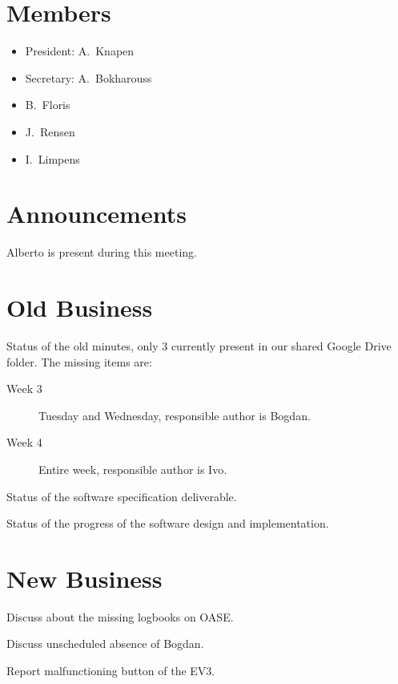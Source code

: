 \section{Members}
\begin{itemize}
	\item President: A.~Knapen
    \item Secretary: A.~Bokharouss
    \item B.~Floris
    \item J.~Rensen
    \item I.~Limpens
\end{itemize}

\section{Announcements}
\begin{items}
	\item Alberto is present during this meeting.
\end{items}


\section{Old Business}
\begin{items}
	\item Status of the old minutes, only 3 currently present in our shared Google Drive folder. The missing items are:
    \begin{description}
    	\item[Week 3] Tuesday and Wednesday, responsible author is Bogdan.
        \item[Week 4] Entire week, responsible author is Ivo.
    \end{description}
    
    \item Status of the software specification deliverable.
    \item Status of the progress of the software design and implementation.
\end{items}


\section{New Business}
\begin{items}
    \item Discuss about the missing logbooks on OASE.
	\item Discuss unscheduled absence of Bogdan.
    \item Report malfunctioning button of the EV3.
\end{items}

\vspace{1em}
